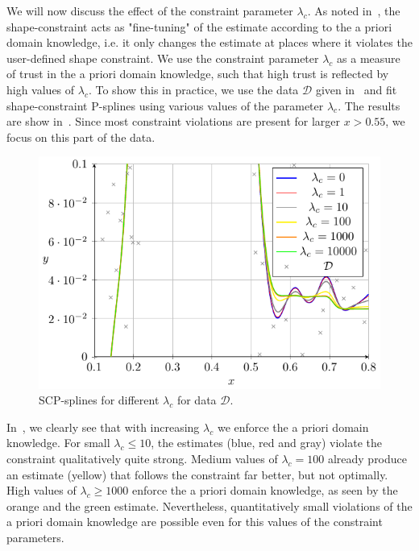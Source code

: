 We will now discuss the effect of the constraint parameter $\lambda_c$. As noted in~, the shape-constraint acts as "fine-tuning" of the estimate according to the a priori domain knowledge, i.e. it only changes the estimate at places where it violates the user-defined shape constraint. We use the constraint parameter $\lambda_c$ as a measure of trust in the a priori domain knowledge, such that high trust is reflected by high values of $\lambda_c$. To show this in practice, we use the data $\mathcal{D}$ given in~ and fit shape-constraint P-splines using various values of the parameter $\lambda_c$. The results are show in~. Since most constraint violations are present for larger $x > 0.55$, we focus on this part of the data. 

\begin{figure}[H]
	\centering
	\includegraphics{graphics/pgfplots/cha4/exp-lambdas.pdf}
	\caption{SCP-splines for different $\lambda_c$ for data $\mathcal{D}$.}
	\label{fig:example-lambdas}
\end{figure}	

In~, we clearly see that with increasing $\lambda_c$ we enforce the a priori domain knowledge. For small $\lambda_c \le 10$, the estimates (blue, red and gray) violate the constraint qualitatively quite strong. Medium values of $\lambda_c = 100$ already produce an estimate (yellow) that follows the constraint far better, but not optimally. High values of $\lambda_c \ge 1000$ enforce the a priori domain knowledge, as seen by the orange and the green estimate. Nevertheless, quantitatively small violations of the a priori domain knowledge are possible even for this values of the constraint parameters. 

